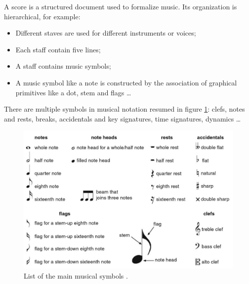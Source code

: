 \documentclass[11pt]{sdm}
\begin{document}
A score is a structured document used to formalize music.
Its organization is hierarchical, for example:
\begin{itemize}
  \item Different staves are used for different instruments or voices;
  \item Each staff contain five lines;
  \item A staff contains music symbols;
  \item A music symbol like a note is constructed by the association of graphical primitives like a dot, stem and flags \ldots
\end{itemize}
There are multiple symbols in musical notation resumed in figure \ref{list_symbols}: clefs, notes and rests, breaks, accidentals and key signatures, time signatures, dynamics \ldots 
\begin{figure}[btp]
  \centering
  \includegraphics[scale=1]{img/list_symbols}
  \caption{\label{list_symbols} List of the main musical symbols \cite{fornes_analysis_2014}. }
\end{figure}
\end{document}
